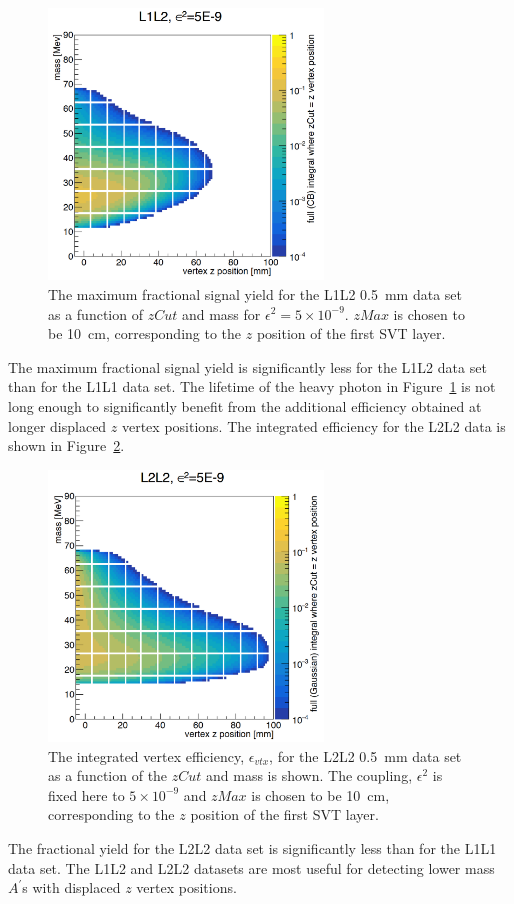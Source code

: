 \begin{figure}[htb]
  \centering
      \includegraphics[width=0.65\textwidth]{pics/searching/integralEff12.png}
  \caption[Integral as a function of mass and $zCut$ for L1L2]{The maximum fractional signal yield for the L1L2 0.5~mm data set as a function of $zCut$ and mass for $\epsilon^2=5\times10^{-9}$. $zMax$ is chosen to be 10~cm, corresponding to the $z$ position of the first SVT layer. }
  \label{fig:effIntegral12}
\end{figure}
The maximum fractional signal yield is significantly less for the L1L2 data set than for the L1L1 data set. The lifetime of the heavy photon in Figure~\ref{fig:effIntegral12} is not long enough to significantly benefit from the additional efficiency obtained at longer displaced $z$ vertex positions. The integrated efficiency for the L2L2 data is shown in Figure~\ref{fig:effIntegral22}.
\begin{figure}[htb]
  \centering
      \includegraphics[width=0.65\textwidth]{pics/searching/integralEff22.png}
  \caption[Integral as a function of mass and $zCut$ for L2L2]{The integrated vertex efficiency, $\epsilon_{vtx}$, for the L2L2 0.5~mm data set as a function of the $zCut$ and mass is shown. The coupling, $\epsilon^2$ is fixed here to $5\times10^{-9}$ and $zMax$ is chosen to be 10~cm, corresponding to the $z$ position of the first SVT layer. }
  \label{fig:effIntegral22}
\end{figure}
The fractional yield for the L2L2 data set is significantly less than for the L1L1 data set.  The L1L2 and L2L2 datasets are most useful for detecting lower mass $A^{\prime}$s with displaced $z$ vertex positions. 

